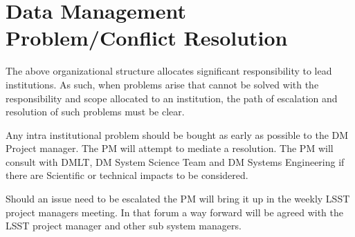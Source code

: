 \section{Data Management Problem/Conflict Resolution }
The above organizational structure allocates significant responsibility to lead institutions.  As such, when problems arise that cannot be solved with the responsibility and scope allocated to an institution, the path of escalation and resolution of such problems must be clear.

Any intra institutional problem should be bought as early as possible to the DM Project manager. The PM will attempt to mediate a resolution. The PM will consult with DMLT, DM System Science Team and DM Systems Engineering if there are Scientific or technical impacts to be considered.

Should an issue need to be escalated the PM will bring it up in the weekly LSST project managers meeting.
In that forum a way forward will be agreed with the LSST project manager and other sub system managers.
